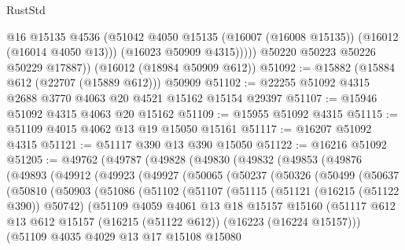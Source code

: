 \begin{lexlean}{RustStd}
\begin{coremodule}
                @16
                @15135
                @4536
                (@51042 @4050 @15135 (@16007 (@16008 @15135)) (@16012 (@16014 @4050 @13)))
                (@16023 @50909 @4315)))))
        @50220
        @50223
        @50226
        @50229
        @17887))
    (@16012 (@18984 @50909 @612))
@51092 := @15882 (@15884 @612 (@22707 (@15889 @612))) @50909
@51102 := @22255 @51092 @4315 @2688 @3770 @4063 @20 @4521 @15162 @15154 @29397
@51107 := @15946 @51092 @4315 @4063 @20 @15162
@51109 := @15955 @51092 @4315
@51115 := @51109 @4015 @4062 @13 @19 @15050 @15161
@51117 := @16207 @51092 @4315
@51121 := @51117 @390 @13 @390 @15050
@51122 := @16216 @51092
@51205 := @49762
    (@49787
      (@49828
        (@49830
          (@49832
            (@49853
              (@49876
                (@49893
                  (@49912
                    (@49923
                      (@49927
                        (@50065
                          (@50237
                            (@50326
                              (@50499
                                (@50637
                                  (@50810
                                    (@50903
                                      (@51086
                                        (@51102
                                          (@51107
                                            (@51115
                                              (@51121 (@16215 (@51122 @390)) @50742)
                                              (@51109
                                                @4059
                                                @4061
                                                @13
                                                @18
                                                @15157
                                                @15160
                                                (@51117
                                                  @612
                                                  @13
                                                  @612
                                                  @15157
                                                  (@16215 (@51122 @612))
                                                  (@16223 (@16224 @15157)))
                                                (@51109
                                                  @4035
                                                  @4029
                                                  @13
                                                  @17
                                                  @15108
                                                  @15080

\end{coremodule}
\end{lexlean}
